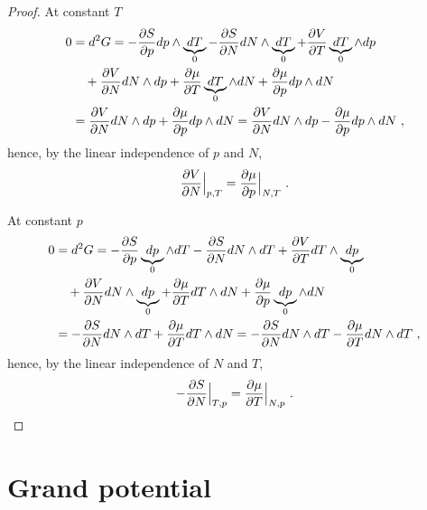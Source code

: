 \begin{proof}
        At constant $T$ 
        \begin{equation*}
        \begin{aligned}
            0 & = d^2 G = - \frac{\partial S}{\partial p} dp \wedge \underbrace{dT}_0 - \frac{\partial S}{\partial N} dN \wedge \underbrace{dT}_0 + \frac{\partial V}{\partial T} \underbrace{dT}_0 \wedge dp \\ & \quad + \frac{\partial V}{\partial N} dN \wedge dp + \frac{\partial\mu}{\partial T} \underbrace{dT}_0 \wedge dN + \frac{\partial\mu}{\partial p} dp \wedge dN \\ & = \frac{\partial V}{\partial N} dN \wedge dp + \frac{\partial\mu}{\partial p} dp \wedge dN = \frac{\partial V}{\partial N} dN \wedge dp - \frac{\partial\mu}{\partial p} dp \wedge dN ~,
        \end{aligned}
        \end{equation*}
        hence, by the linear independence of $p$ and $N$,
        \begin{equation*}
            \frac{\partial V}{\partial N} \Big \vert_{p,T} = \frac{\partial\mu}{\partial p} \Big \vert_{N, T} ~.
        \end{equation*}

        At constant $p$ 
        \begin{equation*}
        \begin{aligned}
            0 & = d^2 G = - \frac{\partial S}{\partial p} \underbrace{dp}_0 \wedge dT - \frac{\partial S}{\partial N} dN \wedge dT + \frac{\partial V}{\partial T} dT \wedge \underbrace{dp}_0 \\ & \quad + \frac{\partial V}{\partial N} dN \wedge \underbrace{dp}_0 + \frac{\partial\mu}{\partial T} dT \wedge dN + \frac{\partial\mu}{\partial p} \underbrace{dp}_0 \wedge dN \\ & = - \frac{\partial S}{\partial N} dN \wedge dT + \frac{\partial\mu}{\partial T} dT \wedge dN = - \frac{\partial S}{\partial N} dN \wedge dT - \frac{\partial\mu}{\partial T} dN \wedge dT ~,
        \end{aligned}
        \end{equation*}
        hence, by the linear independence of $N$ and $T$,
        \begin{equation*}
            - \frac{\partial S}{\partial N} \Big \vert_{T,p} = \frac{\partial\mu}{\partial T} \Big \vert_{N, p} ~.
        \end{equation*}

    \end{proof}

\section{Grand potential} 


